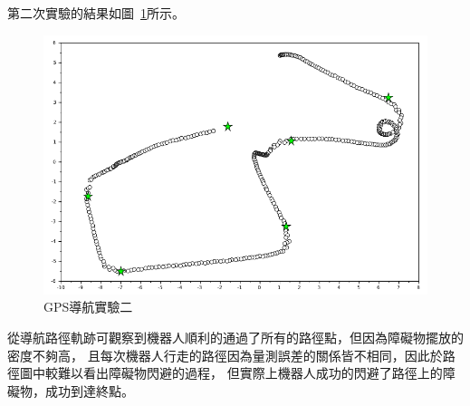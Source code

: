 第二次實驗的結果如圖~\ref{f:exp:nav_2}所示。
\begin{figure}[h!]
	\centering
	\includegraphics[width=\textwidth]{figures/experiments/path_nav_2}
	\caption{GPS導航實驗二}
	\label{f:exp:nav_2}
\end{figure}

從導航路徑軌跡可觀察到機器人順利的通過了所有的路徑點，但因為障礙物擺放的密度不夠高，
且每次機器人行走的路徑因為量測誤差的關係皆不相同，因此於路徑圖中較難以看出障礙物閃避的過程，
但實際上機器人成功的閃避了路徑上的障礙物，成功到達終點。


